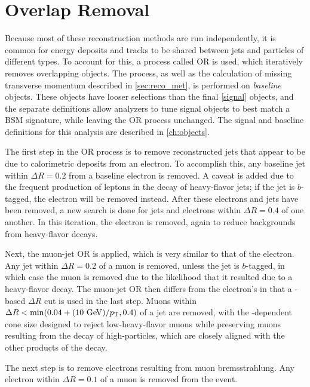 \section{Overlap Removal}
\label{sec:reco_or}

Because most of these reconstruction methods are run independently, it is common for energy deposits and tracks to be shared between jets and particles of different types. To account for this, a process called \acf{OR} is used, which iteratively removes overlapping objects. The process, as well as the calculation of missing transverse momentum described in \autoref{sec:reco_met}, is performed on \textit{baseline} objects. These objects have looser selections than the final \autoref{signal} objects, and the separate definitions allow analyzers to tune signal objects to best match a \ac{BSM} signature, while leaving the \ac{OR} process unchanged. The signal and baseline definitions for this analysis are described in \autoref{ch:objects}.

The first step in the \ac{OR} process is to remove reconstructed jets that appear to be due to calorimetric deposits from an electron. To accomplish this, any baseline jet within $\Delta R = 0.2$ from a baseline electron is removed. A caveat is added due to the frequent production of leptons in the decay of heavy-flavor jets; if the jet is $b$-tagged, the electron will be removed instead. After these electrons and jets have been removed, a new search is done for jets and electrons within $\Delta R = 0.4$ of one another. In this iteration, the electron is removed, again to reduce backgrounds from heavy-flavor decays.

Next, the muon-jet \ac{OR} is applied, which is very similar to that of the electron. Any jet within $\Delta R = 0.2$ of a muon is removed, unless the jet is $b$-tagged, in which case the muon is removed due to the likelihood that it resulted due to a heavy-flavor decay. The muon-jet \ac{OR} then differs from the electron's in that a \pt-based $\Delta R$ cut is used in the last step. Muons within $\Delta R < \mathrm{min}(0.04 + (10 \gev)/\pt, 0.4)$ of a jet are removed, with the \pt-dependent cone size designed to reject low-\pt heavy-flavor muons while preserving muons resulting from the decay of high-\pt particles, which are closely aligned with the other products of the decay. 

The next step is to remove electrons resulting from muon bremsstrahlung. Any electron within $\Delta R = 0.1$ of a muon is removed from the event. 

